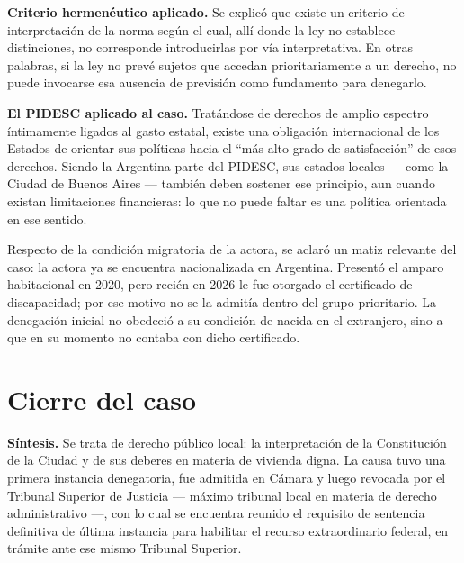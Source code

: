 \documentclass[12pt,oneside]{book}
\begin{document}
\begin{important}
\textbf{Criterio hermenéutico aplicado.} Se explicó que existe un criterio de interpretación de la norma según el cual, allí donde la ley no establece distinciones, no corresponde introducirlas por vía interpretativa. En otras palabras, si la ley no prevé sujetos que accedan prioritariamente a un derecho, no puede invocarse esa ausencia de previsión como fundamento para denegarlo.
\end{important}

\begin{note}
\textbf{El PIDESC aplicado al caso.} Tratándose de derechos de amplio espectro íntimamente ligados al gasto estatal, existe una obligación internacional de los Estados de orientar sus políticas hacia el ``más alto grado de satisfacción'' de esos derechos. Siendo la Argentina parte del PIDESC, sus estados locales --- como la Ciudad de Buenos Aires --- también deben sostener ese principio, aun cuando existan limitaciones financieras: lo que no puede faltar es una política orientada en ese sentido.
\end{note}

Respecto de la condición migratoria de la actora, se aclaró un matiz relevante del caso: la actora ya se encuentra nacionalizada en Argentina. Presentó el amparo habitacional en 2020, pero recién en 2026 le fue otorgado el certificado de discapacidad; por ese motivo no se la admitía dentro del grupo prioritario. La denegación inicial no obedeció a su condición de nacida en el extranjero, sino a que en su momento no contaba con dicho certificado.

\section{Cierre del caso}

\begin{important}
\textbf{Síntesis.} Se trata de derecho público local: la interpretación de la Constitución de la Ciudad y de sus deberes en materia de vivienda digna. La causa tuvo una primera instancia denegatoria, fue admitida en Cámara y luego revocada por el Tribunal Superior de Justicia --- máximo tribunal local en materia de derecho administrativo ---, con lo cual se encuentra reunido el requisito de sentencia definitiva de última instancia para habilitar el recurso extraordinario federal, en trámite ante ese mismo Tribunal Superior.
\end{important}

\end{document}

